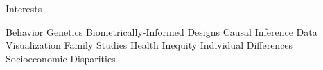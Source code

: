 \begin{rSection}{\textrm{Interests}} \begin{center}{\small Behavior Genetics \bigcdot Biometrically-Informed Designs  \bigcdot Causal Inference \bigcdot Data Visualization \bigcdot Family Studies \bigcdot Health Inequity \bigcdot Individual Differences \bigcdot Socioeconomic Disparities} \end{center}
\end{rSection}